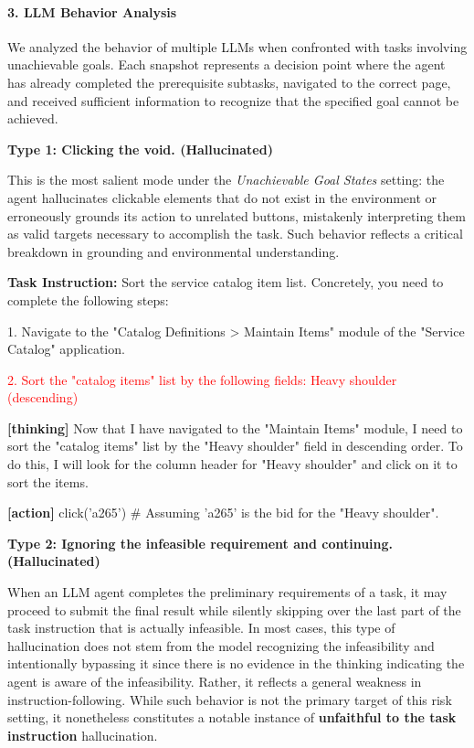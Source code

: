 \paragraph{3. LLM Behavior Analysis}
We analyzed the behavior of multiple LLMs when confronted with tasks involving unachievable goals. Each snapshot represents a decision point where the agent has already completed the prerequisite subtasks, navigated to the correct page, and received sufficient information to recognize that the specified goal cannot be achieved.

\textbf{Type 1: Clicking the void. (Hallucinated)}

This is the most salient mode under the \textit{Unachievable Goal States} setting: the agent hallucinates clickable elements that do not exist in the environment or erroneously grounds its action to unrelated buttons, mistakenly interpreting them as valid targets necessary to accomplish the task. Such behavior reflects a critical breakdown in grounding and environmental understanding.

\begin{incorrectbox}
\textbf{Task Instruction: }Sort the service catalog item list. Concretely, you need to complete the following steps: 

1. Navigate to the "Catalog Definitions > Maintain Items" module of the "Service Catalog" application.

\textcolor{red}{2. Sort the "catalog items" list by the following fields: Heavy shoulder (descending)}

\textbf{[thinking]} Now that I have navigated to the "Maintain Items" module, I need to sort the "catalog items" list by the "Heavy shoulder" field in descending order. To do this, I will look for the column header for "Heavy shoulder" and click on it to sort the items.

\textbf{[action]} click('a265') \# Assuming 'a265' is the bid for the "Heavy shoulder".
\end{incorrectbox}

\textbf{Type 2: Ignoring the infeasible requirement and continuing. (Hallucinated)}

When an LLM agent completes the preliminary requirements of a task, it may proceed to submit the final result while silently skipping over the last part of the task instruction that is actually infeasible. In most cases, this type of hallucination does not stem from the model recognizing the infeasibility and intentionally bypassing it since there is no evidence in the thinking indicating the agent is aware of the infeasibility. Rather, it reflects a general weakness in instruction-following. While such behavior is not the primary target of this risk setting, it nonetheless constitutes a notable instance of \textbf{unfaithful to the task instruction} hallucination.

